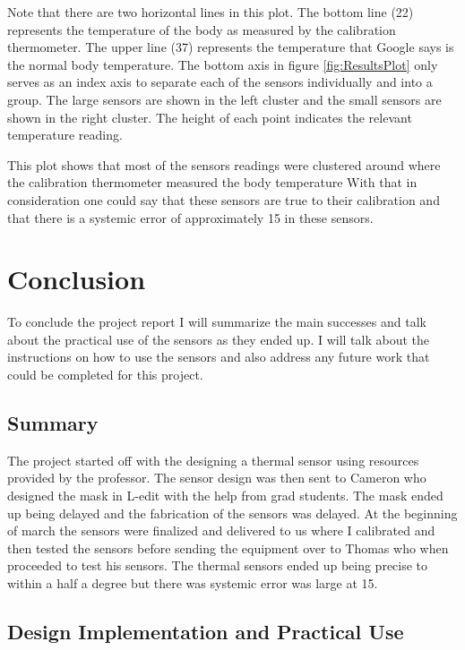 \documentclass[12pt,a4paper]{report}
\begin{document}
Note that there are two horizontal lines in this plot. The bottom line (22\textcelsius{}) represents the temperature of the body as measured by the calibration thermometer. The upper line (37\textcelsius{}) represents the temperature that Google says is the normal body temperature. The bottom axis in figure \ref{fig:ResultsPlot} only serves as an index axis to separate each of the sensors individually and into a group. The large sensors are shown in the left cluster and the small sensors are shown in the right cluster. The height of each point indicates the relevant temperature reading.\par

This plot shows that most of the sensors readings were clustered around where the calibration thermometer measured the body temperature With that in consideration one could say that these sensors are true to their calibration and that there is a systemic error of approximately 15\textcelsius{} in these sensors.


\newpage
\section{Conclusion}
To conclude the project report I will summarize the main successes and talk about the practical use of the sensors as they ended up. I will talk about the instructions on how to use the sensors and also address any future work that could be completed for this project.


\subsection{Summary}

The project started off with the designing a thermal sensor using resources provided by the professor. The sensor design was then sent to Cameron who designed the mask in L-edit with the help from grad students. The mask ended up being delayed and the fabrication of the sensors was delayed. At the beginning of march the sensors were finalized and delivered to us where I calibrated and then tested the sensors before sending the equipment over to Thomas who when proceeded to test his sensors. The thermal sensors ended up being precise to within a half a degree but there was systemic error was large at 15\textcelsius{}. 


\subsection{Design Implementation and Practical Use}
\end{document}
